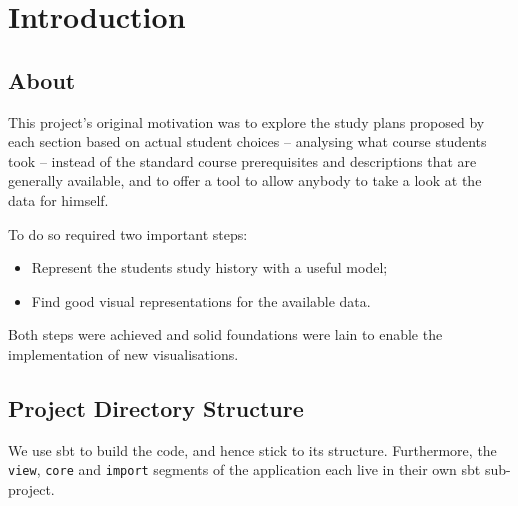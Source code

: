 

\graphicspath{{images/}}





%

 \setcounter{page}{1}

\renewcommand{\contentsname}{Table of Contents}
\tableofcontents
\clearpage
\thispagestyle{empty}
\cleardoublepage

 \setcounter{page}{1}

\chapter{Introduction}
\section{About}
This project's original motivation was to explore the study plans proposed by each section based on actual student choices -- analysing what course students took -- instead of the standard course prerequisites and descriptions that are generally available, and to offer a tool to allow anybody to take a look at the data for himself.

To do so required two important steps:
\begin{itemize}
\item Represent the students study history with a useful model;
\item Find good visual representations for the available data.
\end{itemize}

Both steps were achieved and solid foundations were lain to enable the implementation of new visualisations.

\newpage
\section{Project Directory Structure}
We use sbt to build the code, and hence stick to its structure. Furthermore, the \verb|view|, \verb|core| and \verb|import| segments of the application each live in their own sbt sub-project.

